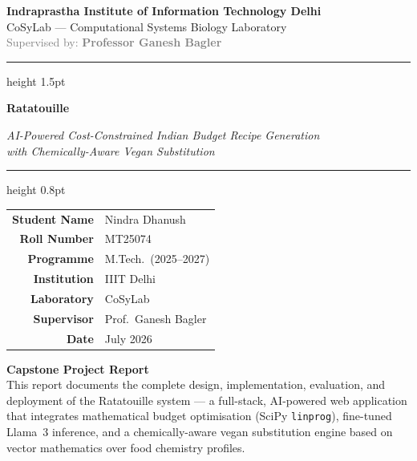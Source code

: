 \documentclass[12pt, a4paper]{article}
\begin{document}
\begin{titlepage}
\centering

\vspace*{1cm}

{\Large \textbf{\textcolor{iitdblue}{Indraprastha Institute of Information Technology Delhi}}}\\[0.3cm]
{\large \textcolor{iitdblue}{CoSyLab --- Computational Systems Biology Laboratory}}\\[0.2cm]
{\normalsize \textcolor{gray}{Supervised by: \textbf{Professor Ganesh Bagler}}}

\vspace{1.2cm}
\hrule height 1.5pt
\vspace{0.6cm}

{\fontsize{22}{28}\selectfont\bfseries\color{iitdblue}
Ratatouille}

\vspace{0.4cm}

{\fontsize{14}{20}\selectfont\color{black}
\textit{AI-Powered Cost-Constrained Indian Budget Recipe Generation\\[4pt]
with Chemically-Aware Vegan Substitution}}

\vspace{0.6cm}
\hrule height 0.8pt
\vspace{1.5cm}

\begin{tabular}{r l}
  \textbf{Student Name} & Nindra Dhanush \\[4pt]
  \textbf{Roll Number}  & MT25074 \\[4pt]
  \textbf{Programme}    & M.Tech.\ (2025--2027) \\[4pt]
  \textbf{Institution}  & IIIT Delhi \\[4pt]
  \textbf{Laboratory}   & CoSyLab \\[4pt]
  \textbf{Supervisor}   & Prof.\ Ganesh Bagler \\[4pt]
  \textbf{Date}         & July 2026 \\
\end{tabular}

\vspace{2cm}

\begin{mdframed}[linecolor=iitdblue!40, backgroundcolor=highlightblue,
                 innertopmargin=10pt, innerbottommargin=10pt,
                 innerleftmargin=16pt, innerrightmargin=16pt]
\textbf{Capstone Project Report} \\[6pt]
This report documents the complete design, implementation, evaluation, and deployment of
the Ratatouille system --- a full-stack, AI-powered web application that integrates
mathematical budget optimisation (SciPy \texttt{linprog}), fine-tuned Llama~3 inference,
and a chemically-aware vegan substitution engine based on vector mathematics over food
chemistry profiles.
\end{mdframed}


\end{titlepage}
\end{document}
